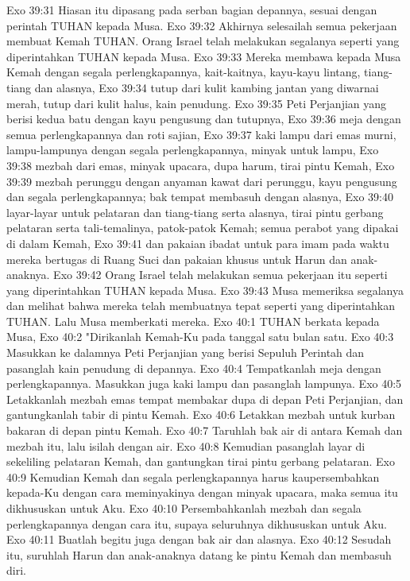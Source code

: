 Exo 39:31  Hiasan itu dipasang pada serban bagian depannya, sesuai dengan perintah TUHAN kepada Musa.
Exo 39:32  Akhirnya selesailah semua pekerjaan membuat Kemah TUHAN. Orang Israel telah melakukan segalanya seperti yang diperintahkan TUHAN kepada Musa.
Exo 39:33  Mereka membawa kepada Musa Kemah dengan segala perlengkapannya, kait-kaitnya, kayu-kayu lintang, tiang-tiang dan alasnya,
Exo 39:34  tutup dari kulit kambing jantan yang diwarnai merah, tutup dari kulit halus, kain penudung.
Exo 39:35  Peti Perjanjian yang berisi kedua batu dengan kayu pengusung dan tutupnya,
Exo 39:36  meja dengan semua perlengkapannya dan roti sajian,
Exo 39:37  kaki lampu dari emas murni, lampu-lampunya dengan segala perlengkapannya, minyak untuk lampu,
Exo 39:38  mezbah dari emas, minyak upacara, dupa harum, tirai pintu Kemah,
Exo 39:39  mezbah perunggu dengan anyaman kawat dari perunggu, kayu pengusung dan segala perlengkapannya; bak tempat membasuh dengan alasnya,
Exo 39:40  layar-layar untuk pelataran dan tiang-tiang serta alasnya, tirai pintu gerbang pelataran serta tali-temalinya, patok-patok Kemah; semua perabot yang dipakai di dalam Kemah,
Exo 39:41  dan pakaian ibadat untuk para imam pada waktu mereka bertugas di Ruang Suci dan pakaian khusus untuk Harun dan anak-anaknya.
Exo 39:42  Orang Israel telah melakukan semua pekerjaan itu seperti yang diperintahkan TUHAN kepada Musa.
Exo 39:43  Musa memeriksa segalanya dan melihat bahwa mereka telah membuatnya tepat seperti yang diperintahkan TUHAN. Lalu Musa memberkati mereka.
Exo 40:1  TUHAN berkata kepada Musa,
Exo 40:2  "Dirikanlah Kemah-Ku pada tanggal satu bulan satu.
Exo 40:3  Masukkan ke dalamnya Peti Perjanjian yang berisi Sepuluh Perintah dan pasanglah kain penudung di depannya.
Exo 40:4  Tempatkanlah meja dengan perlengkapannya. Masukkan juga kaki lampu dan pasanglah lampunya.
Exo 40:5  Letakkanlah mezbah emas tempat membakar dupa di depan Peti Perjanjian, dan gantungkanlah tabir di pintu Kemah.
Exo 40:6  Letakkan mezbah untuk kurban bakaran di depan pintu Kemah.
Exo 40:7  Taruhlah bak air di antara Kemah dan mezbah itu, lalu isilah dengan air.
Exo 40:8  Kemudian pasanglah layar di sekeliling pelataran Kemah, dan gantungkan tirai pintu gerbang pelataran.
Exo 40:9  Kemudian Kemah dan segala perlengkapannya harus kaupersembahkan kepada-Ku dengan cara meminyakinya dengan minyak upacara, maka semua itu dikhususkan untuk Aku.
Exo 40:10  Persembahkanlah mezbah dan segala perlengkapannya dengan cara itu, supaya seluruhnya dikhususkan untuk Aku.
Exo 40:11  Buatlah begitu juga dengan bak air dan alasnya.
Exo 40:12  Sesudah itu, suruhlah Harun dan anak-anaknya datang ke pintu Kemah dan membasuh diri.
